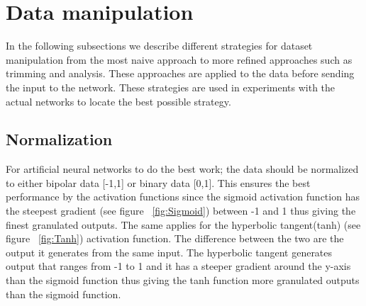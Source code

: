 \section{Data manipulation}
\label{sec:DataManipulation}
In the following subsections we describe different strategies for dataset manipulation from the most naive approach to more refined approaches such as trimming and analysis. These approaches are applied to the data before sending the input to the network. These strategies are used in experiments with the actual networks to locate the best possible strategy.

\subsection{Normalization}
For artificial neural networks to do the best work; the data should be normalized to either bipolar data [-1,1] or binary data [0,1]. This ensures the best performance by the activation functions since the sigmoid activation function has the steepest gradient (see figure ~\ref{fig:Sigmoid}) between -1 and 1 thus giving the finest granulated outputs. The same applies for the hyperbolic tangent(tanh) (see figure ~\ref{fig:Tanh}) activation function. The difference between the two are the output it generates from the same input. The hyperbolic tangent generates output that ranges from -1 to 1 and it has a steeper gradient around the y-axis than the sigmoid function thus giving the tanh function more granulated outputs than the sigmoid function.

